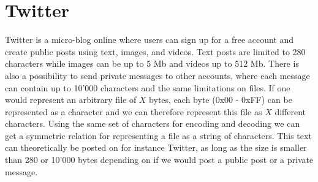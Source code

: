 \section{Twitter}
Twitter is a micro-blog online where users can sign up for a free account and create public posts using text, images, and videos. Text posts are limited to 280 characters while images can be up to 5 Mb and videos up to 512 Mb\cite{MediaBestPractices}. There is also a possibility to send private messages to other accounts, where each message can contain up to 10'000 characters and the same limitations on files. If one would represent an arbitrary file of $X$ bytes, each byte (0x00 - 0xFF) can be represented as a character and we can therefore represent this file as $X$ different characters. Using the same set of characters for encoding and decoding we can get a symmetric relation for representing a file as a string of characters. This text can theoretically be posted on for instance Twitter, as long as the size is smaller than 280 or 10'000 bytes depending on if we would post a public post or a private message.